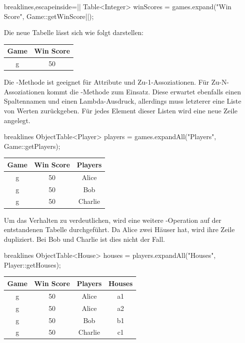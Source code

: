 \begin{jcodeblock*}{breaklines,escapeinside=||}
    Table<Integer> winScores = games.expand("Win Score", Game::getWinScore|\footnotemark|);
\end{jcodeblock*}

Die neue Tabelle lässt sich wie folgt darstellen:

\begin{tabular}{|c|c|}
    \hline
    \textbf{Game} & \textbf{Win Score} \\
    \hline
    g & 50 \\
    \hline
\end{tabular}

Die -Methode ist geeignet für Attribute und Zu-1-Assoziationen.
Für Zu-N-Assoziationen kommt die -Methode zum Einsatz.
Diese erwartet ebenfalls einen Spaltennamen und einen Lambda-Ausdruck,
allerdings muss letzterer eine Liste von Werten zurückgeben.
Für jedes Element dieser Listen wird eine neue Zeile angelegt.

\begin{jcodeblock*}{breaklines}
    ObjectTable<Player> players = games.expandAll("Players", Game::getPlayers);
\end{jcodeblock*}

\begin{tabular}{|c|c|c|}
    \hline
    \textbf{Game} & \textbf{Win Score} & \textbf{Players} \\
    \hline
    g & 50 & Alice   \\
    g & 50 & Bob     \\
    g & 50 & Charlie \\
    \hline
\end{tabular}

Um das Verhalten zu verdeutlichen, wird eine weitere -Operation auf der entstandenen Tabelle durchgeführt.
Da Alice zwei Häuser hat, wird ihre Zeile dupliziert.
Bei Bob und Charlie ist dies nicht der Fall.

\begin{jcodeblock*}{breaklines}
    ObjectTable<House> houses = players.expandAll("Houses", Player::getHouses);
\end{jcodeblock*}

\begin{tabular}{|c|c|c|c|}
    \hline
    \textbf{Game} & \textbf{Win Score} & \textbf{Players} & \textbf{Houses} \\
    \hline
    g & 50 & Alice   & a1 \\
    g & 50 & Alice   & a2 \\
    g & 50 & Bob     & b1 \\
    g & 50 & Charlie & c1 \\
    \hline
\end{tabular}

